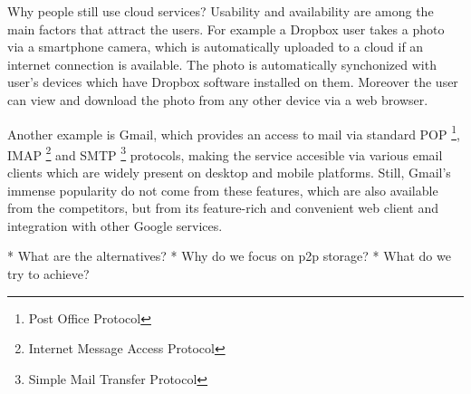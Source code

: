 Why people still use cloud services? Usability and availability are
among the main factors that attract the users. For example a Dropbox
user takes a photo via a smartphone camera, which is automatically
uploaded to a cloud if an internet connection is available.
The photo is automatically synchonized with user's devices which
have Dropbox software installed on them. Moreover the user can
view and download the photo from any other device via a web browser.

Another example is Gmail, which provides an access to mail via
standard
POP \footnote{Post Office Protocol},
IMAP \footnote{Internet Message Access Protocol}
and SMTP \footnote{Simple Mail Transfer Protocol}
protocols, making the service accesible
via various email clients which are widely present on desktop
and mobile platforms. Still, Gmail's immense popularity
\cite{gmail-popularity}
do not come from these features, which are also available
from the competitors, but from its feature-rich and convenient
web client and integration with other Google services.



* What are the alternatives?
* Why do we focus on p2p storage?
* What do we try to achieve?
